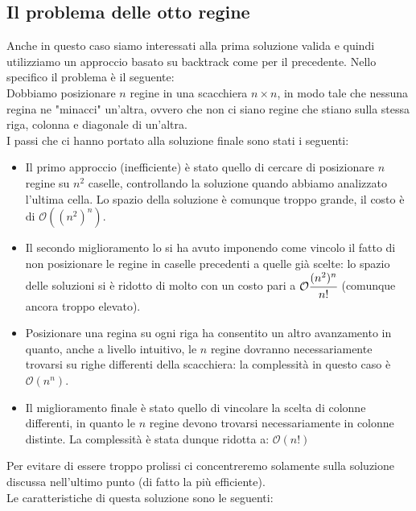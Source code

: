 \documentclass[../cheatSheetAlgoritmi.tex]{subfiles}
\begin{document}
\subsection{Il problema delle otto regine}
Anche in questo caso siamo interessati alla prima soluzione valida e quindi utilizziamo un approccio basato su backtrack come per il precedente. 
Nello specifico il problema è il seguente: \\
Dobbiamo posizionare $n$ regine in una scacchiera $n \times n$, in modo tale che nessuna regina ne "minacci" un'altra, ovvero che non ci siano regine che stiano sulla stessa riga, colonna e diagonale di un'altra.\\
I passi che ci hanno portato alla soluzione finale sono stati i seguenti:
\begin{itemize}
	\item Il primo approccio (inefficiente) è stato quello di cercare di posizionare $n$ regine su $n^2$ caselle, controllando la soluzione quando abbiamo analizzato l'ultima cella. Lo spazio della soluzione è comunque troppo grande, il costo è di $\mathcal{O}((n^2)^n)$.
	\item Il secondo miglioramento lo si ha avuto imponendo come vincolo il fatto di non posizionare le regine in caselle precedenti a quelle già scelte: lo spazio delle soluzioni si è ridotto di molto con un costo pari a  $\mathcal{O}\cfrac{(n^2)^n}{n!}$ (comunque ancora troppo elevato).
	\item Posizionare una regina su ogni riga ha consentito un altro avanzamento in quanto, anche a livello intuitivo, le $n$ regine dovranno necessariamente trovarsi su righe differenti della scacchiera: la complessità in questo caso è $\mathcal{O}(n^n)$.
	\item Il miglioramento finale è stato quello di vincolare la scelta di colonne differenti, in quanto le $n$ regine devono trovarsi necessariamente in colonne distinte. La complessità è stata dunque ridotta a: $\mathcal{O}(n!)$
\end{itemize}
Per evitare di essere troppo prolissi ci concentreremo solamente sulla soluzione discussa nell'ultimo punto (di fatto la più efficiente). \\
Le caratteristiche di questa soluzione sono le seguenti: 
\end{document}
